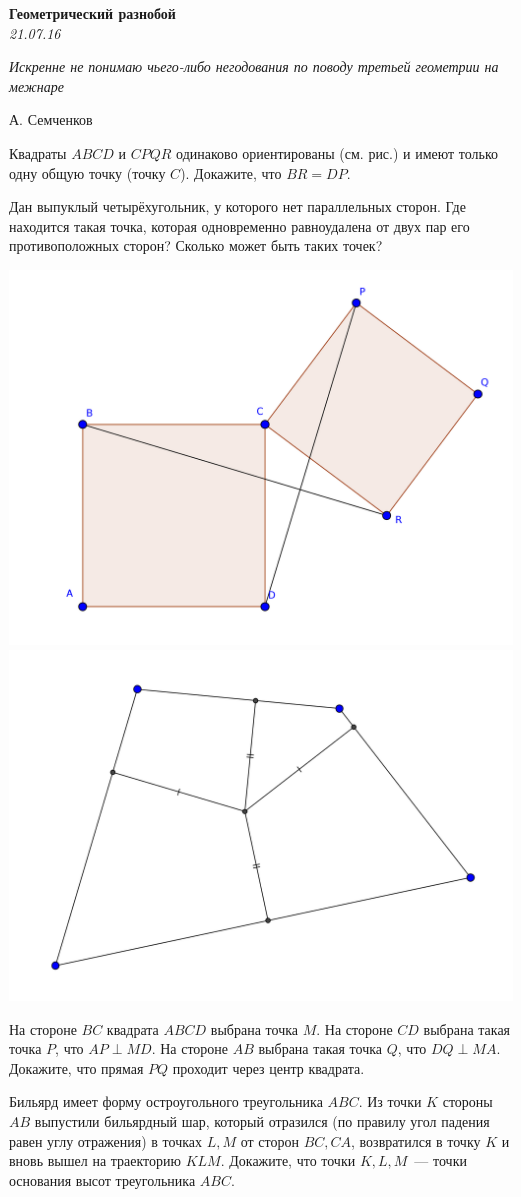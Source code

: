 \begin{center}
\textbf{\Large Геометрический разнобой}\\
\textit{21.07.16}
\end{center}

\epigraph{\it Искренне не понимаю чьего-либо негодования по поводу третьей геометрии на межнаре}{А. Семченков}

\begin{problems}
\item Квадраты $ABCD$ и $CPQR$ одинаково ориентированы (см. рис.) и имеют только одну общую точку (точку $C$). Докажите, что $BR=DP$.

\item Дан выпуклый четырёхугольник, у которого нет параллельных сторон. Где находится такая точка, которая одновременно равноудалена от двух пар его противоположных сторон? Сколько может быть таких точек?

\begin{center}
	\includegraphics[width=.45\textwidth]{georazn01}
	\includegraphics[width=.45\textwidth]{georazn02}
\end{center}

\item На стороне $BC$ квадрата $ABCD$ выбрана точка $M$. На стороне $CD$ выбрана такая точка $P$, что $AP\perp MD$. На стороне $AB$ выбрана такая точка $Q$, что $DQ\perp MA$. Докажите, что прямая $PQ$ проходит через центр квадрата.

\item Бильярд имеет форму остроугольного треугольника $ABC$. Из точки $K$ стороны $AB$ выпустили бильярдный шар, который отразился (по правилу угол падения равен углу отражения) в точках $L, M$ от сторон $BC, CA$, возвратился в точку $K$ и вновь вышел на траекторию $KLM$. Докажите, что точки $K, L, M$~--- точки основания высот треугольника $ABC$.


\end{problems}
